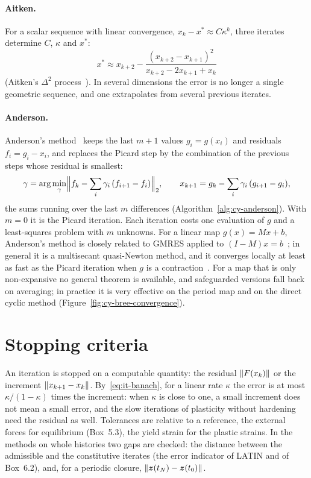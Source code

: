 \paragraph{Aitken.} For a scalar sequence with linear convergence,
$x_k-x^\ast\approx C\kappa^k$, three iterates determine $C$, $\kappa$ and $x^\ast$:
\begin{equation}\label{eq:it-aitken}
  x^\ast\approx x_{k+2}-\frac{(x_{k+2}-x_{k+1})^2}{x_{k+2}-2x_{k+1}+x_k}
\end{equation}
(Aitken's $\Delta^2$ process~\cite{Aitken1926}). In several dimensions the
error is no longer a single geometric sequence, and one extrapolates from
several previous iterates.

\paragraph{Anderson.} Anderson's method~\cite{Anderson1965} keeps the last $m+1$
values $g_i=g(x_i)$ and residuals $f_i=g_i-x_i$, and replaces the Picard step
by the combination of the previous steps whose residual is smallest:
\begin{equation}\label{eq:it-anderson}
  \gamma=\arg\min_\gamma\Bigl\Vert f_k-\sum_{i}\gamma_i\,(f_{i+1}-f_i)\Bigr\Vert_2,
  \qquad
  x_{k+1}=g_k-\sum_i\gamma_i\,(g_{i+1}-g_i),
\end{equation}
the sums running over the last $m$ differences (Algorithm~\ref{alg:cy-anderson}).
With $m=0$ it is the Picard iteration. Each iteration costs one evaluation of
$g$ and a least-squares problem with $m$ unknowns. For a linear map
$g(x)=Mx+b$, Anderson's method is closely related to GMRES applied to
$(I-M)x=b$~\cite{WalkerNi2011}; in general it is a multisecant quasi-Newton
method, and it converges locally at least as fast as the Picard iteration
when $g$ is a contraction~\cite{TothKelley2015}. For a map that is only
non-expansive no general theorem is available, and safeguarded versions
fall back on averaging; in practice it is very effective on the period map
and on the direct cyclic method (Figure~\ref{fig:cy-bree-convergence}).

\section{Stopping criteria}\label{sec:it-stop}
%
An iteration is stopped on a computable quantity: the residual $\lVert F(x_k)\rVert$
or the increment $\lVert x_{k+1}-x_k\rVert$. By~\eqref{eq:it-banach}, for a linear
rate $\kappa$ the error is at most $\kappa/(1-\kappa)$ times the increment: when
$\kappa$ is close to one, a small increment does not mean a small error, and
the slow iterations of plasticity without hardening need the residual as well.
Tolerances are relative to a reference, the external forces for equilibrium
(Box~5.3), the yield strain for the plastic strains. In the methods on whole
histories two gaps are checked: the distance between the admissible and the
constitutive iterates (the error indicator of LATIN and of Box~6.2), and, for
a periodic closure, $\lVert \bm{z}(t_N)-\bm{z}(t_0)\rVert$.


